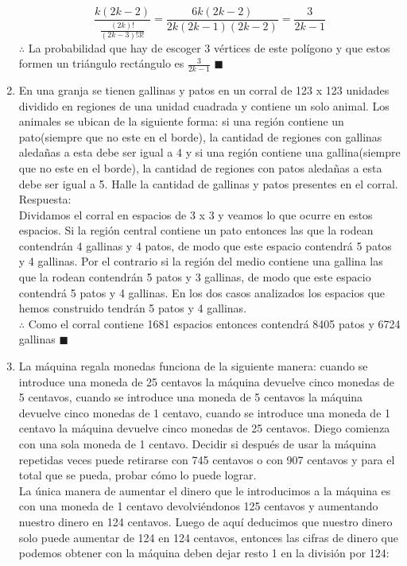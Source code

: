 \documentclass{book}
\begin{document}
\begin{enumerate}
				$$\frac{k(2k-2)}{\frac{(2k)!}{(2k-3)!3!}}=\frac{6k(2k-2)}{2k(2k-1)(2k-2)}=\frac{3}{2k-1}$$
				$\therefore$ La probabilidad que hay de escoger 3 vértices de este polígono y que estos formen un triángulo rectángulo es $\displaystyle{\frac{3}{2k-1}}$ $\blacksquare$\\
				\item En una granja se tienen gallinas y patos en un corral de 123 x 123 unidades dividido en regiones de una unidad cuadrada y contiene un solo animal. Los animales se ubican de la siguiente forma: si una región contiene un pato(siempre que no este en el borde), la cantidad de regiones con gallinas aledañas a esta debe ser igual a 4 y si una región contiene una gallina(siempre que no este en el borde), la cantidad de regiones con patos aledañas a esta debe ser igual a 5. Halle la cantidad de gallinas y patos presentes en el corral.\\
				Respuesta:\\
				Dividamos el corral en espacios de 3 x 3 y veamos lo que ocurre en estos espacios. Si la región central contiene un pato entonces las que la rodean contendrán 4 gallinas y 4 patos, de modo que este espacio contendrá 5 patos y 4 gallinas. Por el contrario si la región del medio contiene una gallina las que la rodean contendrán 5 patos y 3 gallinas, de modo que este espacio contendrá 5 patos y 4 gallinas. En los dos casos analizados los espacios que hemos construido tendrán 5 patos y 4 gallinas. \\$\therefore$ Como el corral contiene 1681 espacios entonces contendrá 8405 patos y 6724 gallinas $\blacksquare$ \\
				\item La máquina regala monedas funciona de la siguiente manera: cuando se introduce una moneda de 25 centavos la máquina devuelve cinco monedas de 5 centavos, cuando se introduce una moneda de 5 centavos la máquina devuelve cinco monedas de 1 centavo, cuando se introduce una moneda de 1 centavo la máquina devuelve cinco monedas de 25 centavos. Diego comienza con una sola moneda de 1 centavo. Decidir si después de usar la máquina repetidas veces puede retirarse con 745 centavos o con 907 centavos y para el total que se pueda, probar cómo lo puede lograr.\\
				La única manera de aumentar el dinero que le introducimos a la máquina es con una moneda de 1 centavo devolviéndonos 125 centavos y aumentando nuestro dinero en 124 centavos. Luego de aquí deducimos que nuestro dinero solo puede aumentar de 124 en 124 centavos, entonces las cifras de dinero que podemos obtener con la máquina deben dejar resto 1 en la división por 124:

\end{enumerate}
\end{document}
